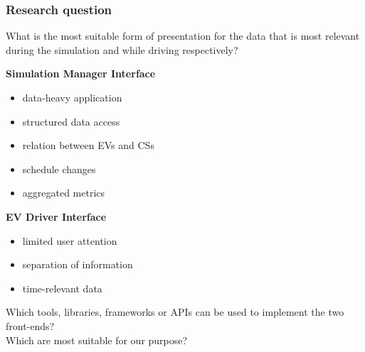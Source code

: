 \begin{frame}
\frametitle{Research question}

What is the most suitable form of presentation for the data that is most relevant during the simulation and while
driving respectively?

\vspace{-8mm}
\begin{PraesentationAufzaehlung}

    \item \textbf{Simulation Manager Interface}
        \begin{itemize}
        \item data-heavy application
        \item structured data access
        \item relation between EVs and CSs
        \item schedule changes
        \item aggregated metrics
        \end{itemize}

    \item \textbf{EV Driver Interface}
        \begin{itemize}
        \item limited user attention
        \item separation of information
        \item time-relevant data
        \end{itemize}

\end{PraesentationAufzaehlung}
\vspace{-2mm}

Which tools, libraries, frameworks or APIs can be used to implement the two front-ends? \\
Which are most suitable for our purpose?

\end{frame}
\clearpage

